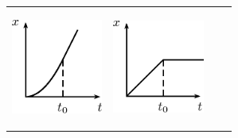 \begin{enumerate}[noitemsep, label=\textbf{\arabic*}. ]
\begin{center}
\begin{xtabular*}{\mytablewidth}[t]{|p{10\mystarwidth}|p{10\mystarwidth}|p{10\mystarwidth}|p{10\mystarwidth}|}
    
        
    \setcounter{subfigure}{0}

\label{m38796*id81664}
    \begin{center}
    \label{m38796*id81664!!!underscore!!!media}\label{m38796*id81664!!!underscore!!!printimage}\includegraphics[width=3cm]{col11305.imgs/m38796_PG10C2_048.png} %
        
      \vspace{2pt}
    \vspace{.1in}
    
    \end{center}



    \addtocounter{footnote}{-0}
     &
    
    
        
    \setcounter{subfigure}{0}

\label{m38796*id81674}
    \begin{center}
    \label{m38796*id81674!!!underscore!!!media}\label{m38796*id81674!!!underscore!!!printimage}\includegraphics[width=3cm]{col11305.imgs/m38796_PG10C2_049.png} %
        
      \vspace{2pt}
    \vspace{.1in}
    
    \end{center}




\end{xtabular*}
\end{center}
\end{enumerate}
